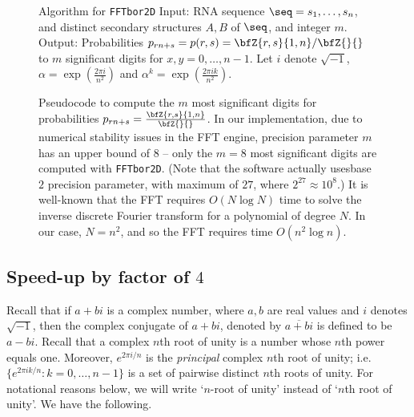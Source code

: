 \begin{figure}[!h]
\begin{small}
{\sc Algorithm} for {\tt FFTbor2D}\hfill\break
{\sc Input:} RNA sequence $\seq=s_1,\ldots,s_n$, and distinct secondary
structures $A,B$ of $\seq$, and integer $m$. \hfill\break
{\sc Output:} Probabilities $p_{rn+s} = p(r,s)=\bfZ{r,s}{1,n}/\bfZ{}{}$
to $m$ significant digits for $x,y=0,\ldots,n-1$.
Let $i$ denote $\sqrt{-1}$, $\alpha = \exp(\frac{2\pi i}{n^2})$ and
$\alpha^k = \exp(\frac{2\pi i k}{n^2})$.
\end{small}
\hfill\break
\smallskip
\begin{small}
\end{small}
\caption{\small
Pseudocode to compute the $m$ most significant digits
for probabilities
$p_{rn+s} = \frac{\bfZ{r,s}{1,n}}{\bfZ{}{}}$. In our implementation,
due to numerical stability issues in the FFT engine, precision parameter
$m$ has an upper bound of $8$ -- only the $m=8$ most significant digits
are computed with {\tt FFTbor2D}.
(Note that the software actually usesbase $2$ precision parameter, with maximum of $27$, where $2^{27} \approx
10^8$.)
It is well-known that
the FFT requires $O(N \log N)$ time to solve the inverse discrete
Fourier transform for a polynomial of degree $N$. In our case,
$N=n^2$, and so the FFT requires time $O(n^2 \log n)$.
}
\label{fig:fftbor}
\end{figure}


\subsection{Speed-up by factor of $4$}
Recall that if $a+bi$ is a complex number, where $a,b$ are real values and $i$
denotes $\sqrt{-1}$, then the complex conjugate of $a+bi$, denoted by
$\overline{a+bi}$ is defined to be $a-bi$.  Recall that a complex $n$th
root of unity is a number whose $n$th power equals one. Moreover,
$e^{2 \pi i/n}$ is the {\em principal} complex $n$th root of unity; i.e.
$\{ e^{2 \pi i k/n} : k=0,\ldots,n-1 \}$ is a set of pairwise distinct
$n$th roots of unity. For notational reasons below, we will write
`$n$-root of unity' instead of `$n$th root of unity'.
We have the following.
\medskip

